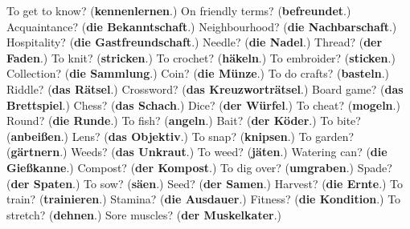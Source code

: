 \begin{tcolorbox}[breakable,colback=teal!4,colframe=teal!35!black,title={Before you move on}]
To get to know? (\textbf{kennenlernen}.) On friendly terms? (\textbf{befreundet}.) Acquaintance? (\textbf{die Bekanntschaft}.) Neighbourhood? (\textbf{die Nachbarschaft}.) Hospitality? (\textbf{die Gastfreundschaft}.) Needle? (\textbf{die Nadel}.) Thread? (\textbf{der Faden}.) To knit? (\textbf{stricken}.) To crochet? (\textbf{häkeln}.) To embroider? (\textbf{sticken}.) Collection? (\textbf{die Sammlung}.) Coin? (\textbf{die Münze}.) To do crafts? (\textbf{basteln}.) Riddle? (\textbf{das Rätsel}.) Crossword? (\textbf{das Kreuzworträtsel}.) Board game? (\textbf{das Brettspiel}.) Chess? (\textbf{das Schach}.) Dice? (\textbf{der Würfel}.) To cheat? (\textbf{mogeln}.) Round? (\textbf{die Runde}.) To fish? (\textbf{angeln}.) Bait? (\textbf{der Köder}.) To bite? (\textbf{anbeißen}.) Lens? (\textbf{das Objektiv}.) To snap? (\textbf{knipsen}.) To garden? (\textbf{gärtnern}.) Weeds? (\textbf{das Unkraut}.) To weed? (\textbf{jäten}.) Watering can? (\textbf{die Gießkanne}.) Compost? (\textbf{der Kompost}.) To dig over? (\textbf{umgraben}.) Spade? (\textbf{der Spaten}.) To sow? (\textbf{säen}.) Seed? (\textbf{der Samen}.) Harvest? (\textbf{die Ernte}.) To train? (\textbf{trainieren}.) Stamina? (\textbf{die Ausdauer}.) Fitness? (\textbf{die Kondition}.) To stretch? (\textbf{dehnen}.) Sore muscles? (\textbf{der Muskelkater}.)
\end{tcolorbox}
